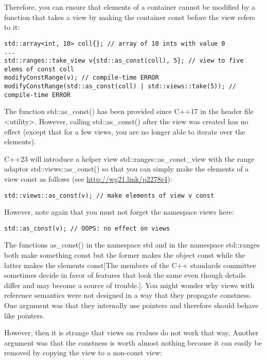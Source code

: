 Therefore, you can ensure that elements of a container cannot be modified by a function that takes a view by making the container const before the view refers to it:

\begin{lstlisting}[style=styleCXX]
std::array<int, 10> coll{}; // array of 10 ints with value 0
...
std::ranges::take_view v{std::as_const(coll), 5}; // view to five elems of const coll
modifyConstRange(v); // compile-time ERROR
modifyConstRange(std::as_const(coll) | std::views::take(5)); // compile-time ERROR
\end{lstlisting}

The function std::as\_const() has been provided since C++17 in the header file <utility>. However, calling std::as\_const() after the view was created has no effect (except that for a few views, you are no longer able to iterate over the elements).

C++23 will introduce a helper view std::ranges::as\_const\_view with the range adaptor std::views::as\_const() so that you can simply make the elements of a view const as follows (see \url{http://wg21.link/p2278r4}):

\begin{lstlisting}[style=styleCXX]
std::views::as_const(v); // make elements of view v const
\end{lstlisting}

However, note again that you must not forget the namespace views here:

\begin{lstlisting}[style=styleCXX]
std::as_const(v); // OOPS: no effect on views
\end{lstlisting}

The functions as\_const() in the namespace std and in the namespace std::ranges both make something const but the former makes the object const while the latter makes the elements const[The members of the C++ standards committee sometimes decide in favor of features that look the same even though details differ and may become a source of trouble.]. You might wonder why views with reference semantics were not designed in a way that they propagate constness. One argument was that they internally use pointers and therefore should behave like pointers.

However, then it is strange that views on rvalues do not work that way. Another argument was that the constness is worth almost nothing because it can easily be removed by copying the view to a non-const view:

